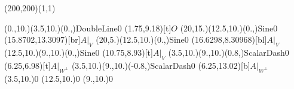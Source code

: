 \unitlength=1bp%

\begin{feynartspicture}(200,200)(1,1)

\FADiagram{}
\FAProp(0.,10.)(3.5,10.)(0.,){DoubleLine}{0}
\FALabel(1.75,9.18)[t]{$O$}
\FAProp(20,15.)(12.5,10.)(0.,){Sine}{0}
\FALabel(15.8702,13.3097)[br]{$A|_V$}
\FAProp(20,5.)(12.5,10.)(0.,){Sine}{0}
\FALabel(16.6298,8.30968)[bl]{$A|_V$}
\FAProp(12.5,10.)(9.,10.)(0.,){Sine}{0}
\FALabel(10.75,8.93)[t]{$A|_V$}
\FAProp(3.5,10.)(9.,10.)(0.8,){ScalarDash}{0}
\FALabel(6.25,6.98)[t]{$A|_{W^\perp}$}
\FAProp(3.5,10.)(9.,10.)(-0.8,){ScalarDash}{0}
\FALabel(6.25,13.02)[b]{$A|_{W^\perp}$}
\FAVert(3.5,10.){0}
\FAVert(12.5,10.){0}
\FAVert(9.,10.){0}
\end{feynartspicture}

